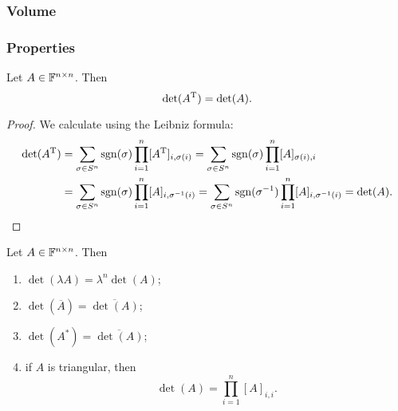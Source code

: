 \subsubsection{Volume}

\subsubsection{Properties}
\begin{lemma}
Let $A\in\mathbb{F}^{n\times n}$. Then
\[ \det(A^{\mathrm{T}}) = \det(A). \]
\end{lemma}
\begin{proof}
We calculate using the Leibniz formula:
\begin{align*}
\det(A^{\mathrm{T}}) &= \sum_{\sigma\in S^n}\operatorname{sgn}(\sigma)\prod_{i=1}^n[A^{\mathrm{T}}]_{i,\sigma(i)} = \sum_{\sigma\in S^n}\operatorname{sgn}(\sigma)\prod_{i=1}^n[A]_{\sigma(i),i} \\
&= \sum_{\sigma\in S^n}\operatorname{sgn}(\sigma)\prod_{i=1}^n[A]_{i,\sigma^{-1}(i)} = \sum_{\sigma\in S^n}\operatorname{sgn}(\sigma^{-1})\prod_{i=1}^n[A]_{i,\sigma^{-1}(i)} = \det(A).
\end{align*}
\end{proof}

\begin{lemma}
Let $A\in\mathbb{F}^{n\times n}$. Then
\begin{enumerate}
\item $\det(\lambda A) = \lambda^n\det(A)$;
\item $\det(\overline{A}) = \overline{\det(A)}$;
\item $\det(A^*) = \overline{\det(A)}$;
\item if $A$ is triangular, then
\[ \det(A) = \prod_{i=1}^n [A]_{i,i}. \]
\end{enumerate}
\end{lemma}

